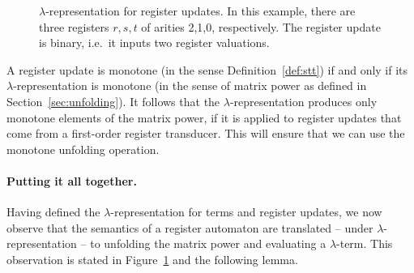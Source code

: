 \begin{figure}[]
    \centering
{}    
    \caption{$\lambda$-representation for register updates. In this example, there are three registers $r,s,t$ of arities 2,1,0, respectively. The register update is binary, i.e.~it inputs two register valuations.}
    \label{fig:labmda-representation-for-register-updates}
\end{figure}

\label{page:monotone-discussed}
A register update is monotone (in the sense Definition~\ref{def:stt}) if and only if its $\lambda$-representation is monotone (in the sense of matrix power as defined in  Section~\ref{sec:unfolding}). It follows that the $\lambda$-representation produces only monotone elements of the matrix power, if it is applied to register updates that come from a first-order register transducer. 
This will ensure that we can use the monotone unfolding operation. 

\paragraph*{Putting it all together.}
Having defined the $\lambda$-representation for terms and register updates, we now observe  that the semantics of a register automaton are translated -- under $\lambda$-representation -- to unfolding the matrix power and evaluating a $\lambda$-term.  This observation is stated in Figure~\ref{fig:labmda-representation-for-register-updates} and the following lemma.

